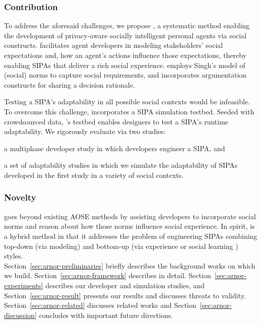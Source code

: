 \subsubsection*{Contribution} 
To address the aforesaid challenges, we propose \frameworkA, a systematic 
method enabling the development of privacy-aware socially intelligent personal 
agents via social constructs.  \frameworkA facilitates agent developers in modeling
stakeholders' social expectations and, how an agent's actions influence 
those expectations, thereby enabling SIPAs that deliver a rich
social experience.  
\frameworkA employs Singh's \citeyearpar{Singh-2013-Norms} model of (social)
norms to capture social requirements, and incorporates argumentation
constructs \citep{BenchCapon-2007-Argumentation+AI} for
sharing a decision rationale.

Testing a SIPA's adaptability in all possible social contexts would be infeasible. 
To overcome this challenge, \frameworkA incorporates a SIPA simulation testbed. 
Seeded with crowdsourced data, \frameworkA's testbed enables designers to test a
SIPA's runtime adaptability.
We rigorously evaluate \frameworkA via two studies:
\begin{enumerate*}[label=(\arabic*)]
\item a multiphase developer study in which developers engineer a SIPA,
and
\item a set of adaptability studies in which we simulate the
adaptability of SIPAs developed in the first study in a variety of
social contexts. \end{enumerate*}

\subsubsection*{Novelty}
\frameworkA goes beyond existing AOSE methods by assisting
developers to incorporate social norms and reason about how those norms
influence social experience. In spirit, \frameworkA is a hybrid method in
that it addresses the problem of engineering SIPAs combining top-down (via
modeling) and bottom-up (via experience or social learning
\citep{Sen-IJCAI07-NormEmergence}) styles.\\

Section~\ref{sec:arnor-preliminaries} briefly describes the background
works on which we build. Section~\ref{sec:arnor-framework} describes
\frameworkA in detail. Section~\ref{sec:arnor-experiments} describes our
developer and simulation studies, and Section~\ref{sec:arnor-result}
presents our results and discusses threats to validity.
Section~\ref{sec:arnor-related} discusses related works and
Section~\ref{sec:arnor-discussion} concludes with important future
directions.

